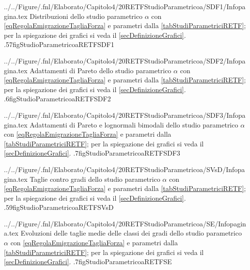             {../../Figure/.fnl/Elaborato/Capitolo4/20RETFStudioParametricoa/SDF1/Infopagina.tex}
            {Distribuzioni dello studio parametrico \(\alpha\) con \ref{eqRegolaEmigrazioneTagliaForza} e parametri dalla \cref{tabStudiParametriciRETF}; per la spiegazione dei grafici si veda il \cref{secDefinizioneGrafici}.}
            {.57\linewidth}{figStudioParametricoaRETFSDF1}
    
            {../../Figure/.fnl/Elaborato/Capitolo4/20RETFStudioParametricoa/SDF2/Infopagina.tex}
            {Adattamenti di Pareto dello studio parametrico \(\alpha\) con \ref{eqRegolaEmigrazioneTagliaForza} e parametri dalla \cref{tabStudiParametriciRETF}; per la spiegazione dei grafici si veda il \cref{secDefinizioneGrafici}.}
            {.6\linewidth}{figStudioParametricoaRETFSDF2}
    
            {../../Figure/.fnl/Elaborato/Capitolo4/20RETFStudioParametricoa/SDF3/Infopagina.tex}
            {Adattamenti di Pareto e lognormali bimodali dello studio parametrico \(\alpha\) con \ref{eqRegolaEmigrazioneTagliaForza} e parametri dalla \cref{tabStudiParametriciRETF}; per la spiegazione dei grafici si veda il \cref{secDefinizioneGrafici}.}
            {.7\linewidth}{figStudioParametricoaRETFSDF3}
    
            {../../Figure/.fnl/Elaborato/Capitolo4/20RETFStudioParametricoa/SVsD/Infopagina.tex}
            {Taglie contro gradi dello studio parametrico \(\alpha\) con \ref{eqRegolaEmigrazioneTagliaForza} e parametri dalla \cref{tabStudiParametriciRETF}; per la spiegazione dei grafici si veda il \cref{secDefinizioneGrafici}.}
            {.59\linewidth}{figStudioParametricoaRETFSVsD}
            
            {../../Figure/.fnl/Elaborato/Capitolo4/20RETFStudioParametricoa/SE/Infopagina.tex}
            {Evoluzioni delle taglie medie delle classi dei gradi dello studio parametrico \(\alpha\) con \ref{eqRegolaEmigrazioneTagliaForza} e parametri dalla \cref{tabStudiParametriciRETF}; per la spiegazione dei grafici si veda il \cref{secDefinizioneGrafici}.}
            {.7\linewidth}{figStudioParametricoaRETFSE}

